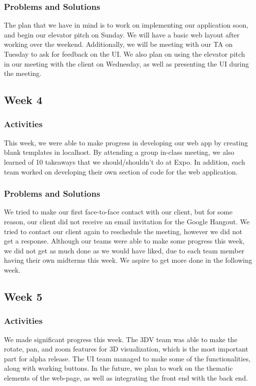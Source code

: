 \documentclass[journal,10pt,onecolumn,compsoc]{IEEEtran} \usepackage[margin=1.0in]{geometry} \usepackage{pdfpages}
\begin{document}
    \subsubsection{Problems and Solutions}
    The plan that we have in mind is to work on implementing our application soon, and begin our elevator pitch on Sunday. We will have a basic web layout after working over the weekend. Additionally, we will be meeting with our TA on Tuesday to ask for feedback on the UI. We also plan on using the elevator pitch in our meeting with the client on Wednesday, as well as presenting the UI during the meeting.
    
\subsection{Week 4}
    \subsubsection{Activities}
    This week, we were able to make progress in developing our web app by creating blank templates in localhost. By attending a group in-class meeting, we also learned of 10 takeaways that we should/shouldn't do at Expo. In addition, each team worked on developing their own section of code for the web application. 
    \subsubsection{Problems and Solutions}
    We tried to make our first face-to-face contact with our client, but for some reason, our client did not receive an email invitation for the Google Hangout. We tried to contact our client again to reschedule the meeting, however we did not get a response.
    Although our teams were able to make some progress this week, we did not get as much done as we would have liked, due to each team member having their own midterms this week. We aspire to get more done in the following week.
    
\subsection{Week 5}
    \subsubsection{Activities}
    We made significant progress this week. The 3DV team was able to make the rotate, pan, and zoom features for 3D visualization, which is the most important part for alpha release. The UI team managed to make some of the functionalities, along with working buttons. In the future, we plan to work on the thematic elements of the web-page, as well as integrating the front end with the back end.
\end{document}
